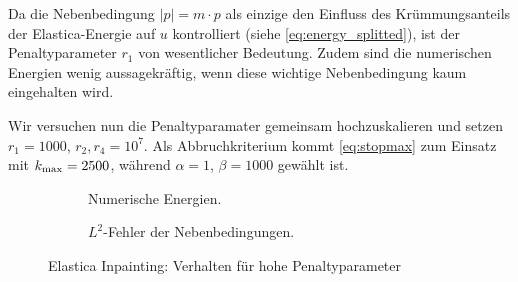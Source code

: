 \documentclass{mythesis}
\begin{document}
Da die Nebenbedingung $|p| = m \cdot p$ als einzige den Einfluss des Krümmungsanteils der Elastica-Energie auf $u$ kontrolliert (siehe \eqref{eq:energy_splitted}), ist der Penaltyparameter $r_1$ von wesentlicher Bedeutung.
Zudem sind die numerischen Energien wenig aussagekräftig, wenn diese wichtige Nebenbedingung kaum eingehalten wird.

Wir versuchen nun die Penaltyparamater gemeinsam hochzuskalieren und setzen $r_1 = 1000$, $r_2, r_4 = 10^7$.
Als Abbruchkriterium kommt \eqref{eq:stopmax} zum Einsatz mit $k_{\mathrm{max}} = 2500$, während $\alpha = 1$, $\beta = 1000$ gewählt ist.

\begin{figure}[ht]
    \begin{subfigure}{0.5\textwidth}
	\centering
	\caption{Numerische Energien.}
	\label{fig:num_eescale_energy}
    \end{subfigure}%
    \begin{subfigure}{0.5\textwidth}
	\centering
	\caption{$L^2$-Fehler der Nebenbedingungen.}
	\label{fig:num_eescale_constr}
    \end{subfigure}
    \caption{Elastica Inpainting: Verhalten für hohe Penaltyparameter}
    \label{fig:num_eescale}
\end{figure}
\end{document}
